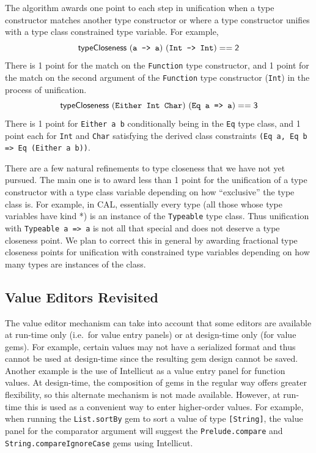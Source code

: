 \documentclass[preprint]{sigplanconf}
\begin{document}
The algorithm awards one point to each step in unification when a type
constructor matches another type constructor or where a type
constructor unifies with a type class constrained type variable. For
example,
\begin{equation*}
\mathsf{typeCloseness~(\text{\tt a -> a})~(\text{\tt Int -> Int}) == 2}
\end{equation*}
There is 1 point for the match on the {\tt Function} type constructor, and 1
point for the match on the second argument of the {\tt Function} type
constructor ({\tt Int}) in the process of unification.
\begin{equation*}
\mathsf{typeCloseness~(\text{\tt Either Int Char})~(\text{\tt Eq a => a}) == 3}
\end{equation*}
There is 1 point for {\tt Either a b} conditionally being in the {\tt Eq} type class, and 1
point each for {\tt Int} and {\tt Char} satisfying the derived class constraints
{\tt (Eq a, Eq b => Eq (Either a b))}.

There are a few natural refinements to type closeness that we have not
yet pursued. The main one is to award less than 1 point for the
unification of a type constructor with a type class variable depending
on how ``exclusive'' the type class is. For example, in CAL, essentially
every type (all those whose type variables have kind *) is an instance
of the {\tt Typeable} type class. Thus unification with {\tt Typeable a => a}
is not all that special and does not deserve a type closeness
point. We plan to correct this in general by awarding fractional
type closeness points for unification with constrained type variables
depending on how many types are instances of the class.

\subsection{Value Editors Revisited}
\label{sec:valueEditorsRevisited}

The value editor mechanism can take into account that some editors are
available at run-time only (i.e.\ for value entry panels) or at
design-time only (for value gems). For example, certain values may not
have a serialized format and thus cannot be used at design-time since
the resulting gem design cannot be saved. Another example is the use
of Intellicut as a value entry panel for function values. 
At design-time, the composition of gems in the regular way offers greater 
flexibility, so this alternate mechanism is not made available.
However, at run-time this is used as a convenient way to enter higher-order
values. For example, when running the {\tt List.sortBy} gem to
sort a value of type {\tt [String]}, the value panel for the
comparator argument will suggest the {\tt Prelude.compare} and {\tt
String.compareIgnoreCase} gems using Intellicut.
\end{document}
